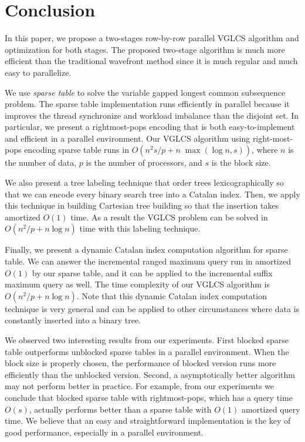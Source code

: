\section{Conclusion}
\label{sec:Conclusion}

In this paper, we propose a two-stages row-by-row parallel VGLCS
algorithm and optimization for both stages.  The proposed two-stage
algorithm is much more efficient than the traditional wavefront method
since it is much regular and much easy to parallelize.


We use {\em sparse table} to solve the variable gapped longest common
subsequence problem.  The sparse table implementation runs efficiently
in parallel because it improves the thread synchronize and workload
imbalance than the disjoint set.  In particular, we present a
rightmost-pops encoding that is both easy-to-implement and efficient
in a parallel environment.  Our VGLCS algorithm using right-most-pops
encoding sparse table runs in $O(n^2 s / p + n \; \max(\log n, s))$,
where $n$ is the number of data, $p$ is the number of processors, and
$s$ is the block size.

We also present a tree labeling technique that order trees
lexicographically so that we can encode every binary search tree into
a Catalan index.  Then, we apply this technique in building Cartesian
tree building so that the insertion takes amortized $O(1)$ time.  As a
result the VGLCS problem can be solved in $O(n^2 / p + n \log n)$
time with this labeling technique.

Finally, we present a dynamic Catalan index computation algorithm for
sparse table.  We can answer the incremental ranged maximum query run in
amortized $O(1)$ by our sparse table, and it can be applied to the
incremental suffix maximum query as well.  The time complexity of our
VGLCS algorithm is $O(n^2 / p + n \log n)$.  Note that this dynamic
Catalan index computation technique is very general and can be applied
to other circumstances where data is constantly inserted into a binary
tree.

We observed two interesting results from our experiments.  First
blocked sparse table outperforms unblocked sparse tables in a
parallel environment.  When the block size is properly chosen, the
performance of blocked version runs more efficiently than the unblocked
version.  Second, a asymptotically better algorithm may not perform
better in practice.  For example, from our experiments we conclude
that blocked sparse table with rightmost-pops, which has a query time
$O(s)$, actually performs better than a sparse table with $O(1)$
amortized query time.  We believe that an easy and straightforward
implementation is the key of good performance, especially in a
parallel environment.
